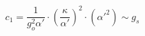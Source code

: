 \begin{equation}
c_1 = \frac{1}{g_o^2 \alpha' } \cdot \left ( \frac{\kappa}{\alpha'}
\right )^2 \cdot (\alpha'^2) \sim g_s
\label{c1}
\end{equation}

